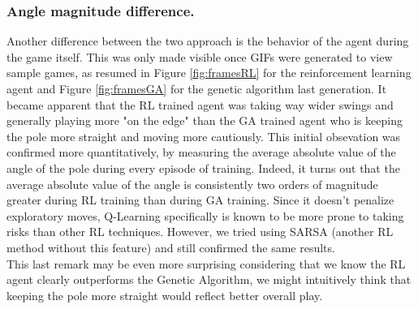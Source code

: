 \subsubsection{Angle magnitude difference.}
Another difference between the two approach is the behavior of the agent during the game itself.
This was only made visible once GIFs were generated to view sample games, as resumed in Figure \ref{fig:framesRL} for the reinforcement learning agent and Figure \ref{fig:framesGA} for the genetic algorithm last generation. 
It became apparent that the RL trained agent was taking way wider swings and generally playing more "on the edge" than the GA trained agent who is keeping the pole more straight and moving more cautiously.
This initial obsevation was confirmed more quantitatively, by measuring the average absolute value of the angle of the pole during every episode of training.
Indeed, it turns out that the average absolute value of the angle is consistently two orders of magnitude greater during RL training than during GA training.
Since it doesn't penalize exploratory moves, Q-Learning specifically is known to be more prone to taking risks than other RL techniques. However, we tried using SARSA (another RL method without this feature) and still confirmed the same results.
\\
This last remark may be even more surprising considering that we know the RL agent clearly outperforms the Genetic Algorithm, we might intuitively think that keeping the pole more straight would reflect better overall play.



